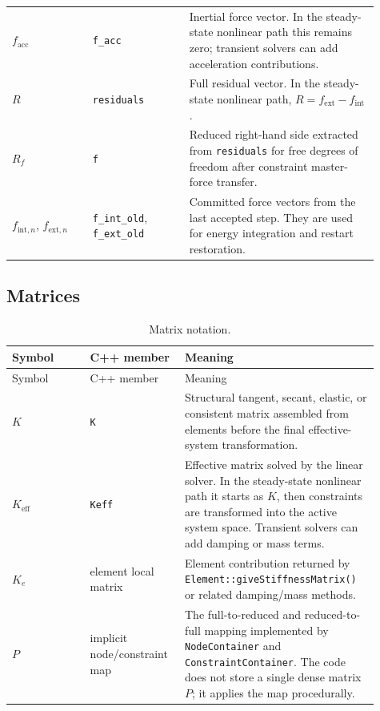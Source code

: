 \documentclass[11pt,a4paper]{article}
\newcommand{\code}[1]{\ifmmode\text{\texttt{\detokenize{#1}}}\else\nolinkurl{#1}\fi}
\begin{document}
\begin{longtable}{p{0.20\linewidth} p{0.24\linewidth} p{0.47\linewidth}}
\(f_{\mathrm{acc}}\) & \code{f_acc} &
Inertial force vector.  In the steady-state nonlinear path this remains zero;
transient solvers can add acceleration contributions. \\

\(R\) & \code{residuals} &
Full residual vector.  In the steady-state nonlinear path,
\(R = f_{\mathrm{ext}} - f_{\mathrm{int}}\). \\

\(R_f\) & \code{f} &
Reduced right-hand side extracted from \code{residuals} for free degrees of
freedom after constraint master-force transfer. \\

\(f_{\mathrm{int},n}\), \(f_{\mathrm{ext},n}\) &
\code{f_int_old}, \code{f_ext_old} &
Committed force vectors from the last accepted step.  They are used for energy
integration and restart restoration. \\
\bottomrule
\end{longtable}

\subsection{Matrices}

\begin{longtable}{p{0.20\linewidth} p{0.24\linewidth} p{0.47\linewidth}}
\caption{Matrix notation.}
\label{tab:matrix-notation}\\
\toprule
Symbol & C++ member & Meaning \\
\midrule
\endfirsthead
\toprule
Symbol & C++ member & Meaning \\
\midrule
\endhead
\(K\) & \code{K} &
Structural tangent, secant, elastic, or consistent matrix assembled from
elements before the final effective-system transformation. \\

\(K_{\mathrm{eff}}\) & \code{Keff} &
Effective matrix solved by the linear solver.  In the steady-state nonlinear
path it starts as \(K\), then constraints are transformed into the active
system space.  Transient solvers can add damping or mass terms. \\

\(K_e\) & element local matrix &
Element contribution returned by \code{Element::giveStiffnessMatrix()} or
related damping/mass methods. \\

\(P\) & implicit node/constraint map &
The full-to-reduced and reduced-to-full mapping implemented by
\code{NodeContainer} and \code{ConstraintContainer}.  The code does not store a
single dense matrix \(P\); it applies the map procedurally. \\
\bottomrule
\end{longtable}
\end{document}
